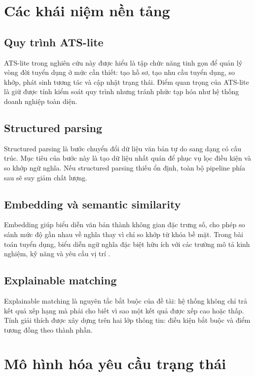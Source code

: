 \section{Các khái niệm nền tảng}

\subsection{Quy trình ATS-lite}

ATS-lite trong nghiên cứu này được hiểu là tập chức năng tinh gọn để quản lý vòng đời tuyển dụng ở mức cần thiết: tạo hồ sơ, tạo nhu cầu tuyển dụng, so khớp, phát sinh tương tác và cập nhật trạng thái. Điểm quan trọng của ATS-lite là giữ được tính kiểm soát quy trình nhưng tránh phức tạp hóa như hệ thống doanh nghiệp toàn diện.

\subsection{Structured parsing}

Structured parsing là bước chuyển đổi dữ liệu văn bản tự do sang dạng có cấu trúc. Mục tiêu của bước này là tạo dữ liệu nhất quán để phục vụ lọc điều kiện và so khớp ngữ nghĩa. Nếu structured parsing thiếu ổn định, toàn bộ pipeline phía sau sẽ suy giảm chất lượng.

\subsection{Embedding và semantic similarity}

Embedding giúp biểu diễn văn bản thành không gian đặc trưng số, cho phép so sánh mức độ gần nhau về nghĩa thay vì chỉ so khớp từ khóa bề mặt. Trong bài toán tuyển dụng, biểu diễn ngữ nghĩa đặc biệt hữu ích với các trường mô tả kinh nghiệm, kỹ năng và yêu cầu vị trí \cite{hld-matching,hld-storage}.

\subsection{Explainable matching}

Explainable matching là nguyên tắc bắt buộc của đề tài: hệ thống không chỉ trả kết quả xếp hạng mà phải cho biết vì sao một kết quả được xếp cao hoặc thấp. Tính giải thích được xây dựng trên hai lớp thông tin: điều kiện bắt buộc và điểm tương đồng theo thành phần.

\section{Mô hình hóa yêu cầu trạng thái}

